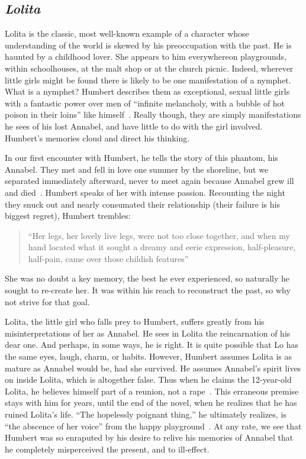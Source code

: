 \subsection{\emph{Lolita}}
Lolita is the classic, most well-known example of a character whose understanding of the world is skewed by his preoccupation with the past.
He is haunted by a childhood lover. 
She appears to him everywhere\textemdash on playgrounds, within schoolhouses, at the malt shop or at the church picnic.
Indeed, wherever little girls might be found there is likely to be one manifestation of a nymphet.
What is a nymphet? 
Humbert describes them as exceptional, sexual little girls with a fantastic power over men of ``infinite melancholy, with a bubble of hot poison in their loins'' like himself~\cite{lolita}.
Really though, they are simply manifestations he sees of his lost Annabel, and have little to do with the girl involved.
Humbert's memories cloud and direct his thinking.

In our first encounter with Humbert, he tells the story of this phantom, his Annabel. 
They met and fell in love one summer by the shoreline, but we separated immediately afterward, never to meet again because Annabel grew ill and died~\cite{lolita}.
Humbert speaks of her with intense passion.
Recounting the night they snuck out and nearly consumated their relationship (their failure is his biggest regret), Humbert trembles: 
\begin{quotation}
``Her legs, her lovely live legs, were not too close together, and when my hand located what it sought a dreamy and eerie expression, half-pleasure, half-pain, came over those childish features''~\cite[7]{lolita}
\end{quotation}
She was no doubt a key memory, the best he ever experienced, so naturally he sought to re-create her. 
It was within his reach to reconstruct the past, so why not strive for that goal.

Lolita, the little girl who falls prey to Humbert, suffers greatly from his misinterpretations of her as Annabel.
He sees in Lolita the reincarnation of his dear one. 
And perhaps, in some ways, he is right. 
It is quite possible that Lo has the same eyes, laugh, charm, or habits. 
However, Humbert assumes Lolita is as mature as Annabel would be, had she survived. 
He assumes Annabel's spirit lives on inside Lolita, which is altogether false. 
Thus when he claims the 12-year-old Lolita, he believes himself part of a reunion, not a rape~\cite{lolita}.
This erraneous premise stays with him for years, until the end of the novel, when he realizes that he has ruined Lolita's life.
``The hopelessly poignant thing,'' he ultimately realizes, is ``the abscence of her voice'' from the happy playground~\cite[223]{lolita}.
At any rate, we see that Humbert was so enraputed by his desire to relive his memories of Annabel that he completely misperceived the present, and to ill-effect.
